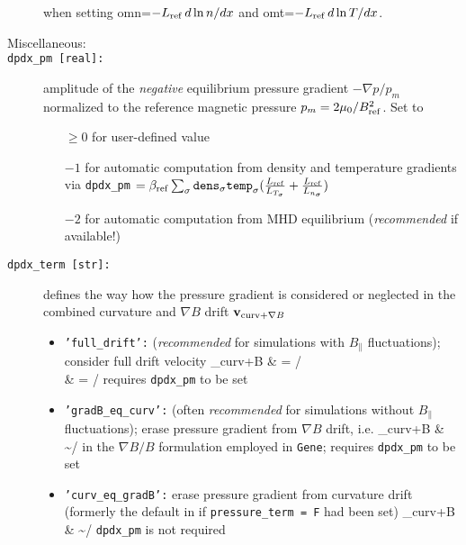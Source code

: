 \documentclass[12pt]{article}
\begin{document}
\begin{description}
  when setting omn=$-L_{{\rm ref}} \, d \ln n/dx$ and omt=$-L_{{\rm ref}} \, d \ln T /dx$.
\item[Miscellaneous:]
\item[\hypertarget{dpdx_pm}{\tt dpdx\_pm [real]:}] amplitude of the {\em negative} equilibrium pressure gradient $-\nabla p/p_m$
normalized to the reference magnetic pressure $p_m = 2\mu_0/B_{\rm ref}^2$. Set to
\begin{itemize}
 \item[$\geq 0$] for user-defined value
 \item[$-1$] for automatic computation from density and temperature gradients via
 \texttt{dpdx\_pm} $=\beta_{\rm ref} \sum_\sigma \texttt{dens}_\sigma {\tt temp}_\sigma (\frac{L_{\rm ref}}{L_{T_\sigma}}+\frac{L_{\rm ref}}{L_{n_\sigma}})$
 \item[$-2$] for automatic computation from MHD equilibrium ({\em recommended} if available!)
\end{itemize}

\item[\hypertarget{dpdx_term}{\tt dpdx\_term [str]:}] defines the way how the pressure gradient is considered or neglected in the
combined curvature and $\nabla B$ drift $\mathbf{v}_{{\rm curv}+\nabla B}$
\begin{itemize}
 \item {\tt 'full\_drift':} ({\em recommended} for simulations with $B_\|$ fluctuations); consider full drift velocity
 \bea
 _{{\rm curv}+\nabla B} & = \times{}/\Omega \nn \\
 & = \times{}/\Omega \nn
 \eea
 requires {\tt dpdx\_pm} to be set
 \item {\tt 'gradB\_eq\_curv':} (often {\em recommended} for simulations without $B_\|$ fluctuations); erase pressure gradient from $\nabla B$ drift, i.e.
 \bea
 _{{\rm curv}+\nabla B} & \sim {}\times{}/\Omega \nn
 \eea
 in the $\nabla B/B$ formulation employed in {\tt Gene}; requires {\tt dpdx\_pm} to be set
 \item {\tt 'curv\_eq\_gradB':} erase pressure gradient from curvature drift (formerly the default in \gene if {\tt pressure\_term = F} had been set)
 \bea
 _{{\rm curv}+\nabla B} & \sim {}\times{}/\Omega \nn
 \eea
 {\tt dpdx\_pm} is not required
 \end{itemize}


\end{description}
\end{document}
